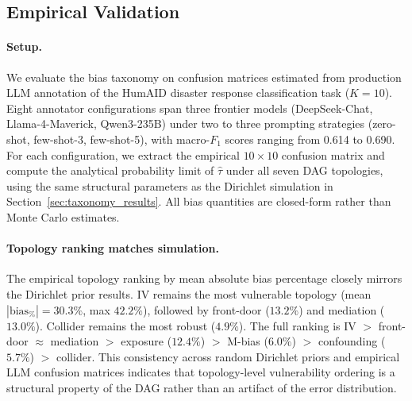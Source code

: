 
\subsection{Empirical Validation}
\label{sec:empirical}

\paragraph{Setup.}
We evaluate the bias taxonomy on confusion matrices estimated from production LLM annotation of the HumAID disaster response classification task ($K{=}10$). Eight annotator configurations span three frontier models (DeepSeek-Chat, Llama-4-Maverick, Qwen3-235B) under two to three prompting strategies (zero-shot, few-shot-3, few-shot-5), with macro-$F_1$ scores ranging from 0.614 to 0.690. For each configuration, we extract the empirical $10{\times}10$ confusion matrix and compute the analytical probability limit of $\hat{\tau}$ under all seven DAG topologies, using the same structural parameters as the Dirichlet simulation in Section~\ref{sec:taxonomy_results}. All bias quantities are closed-form rather than Monte Carlo estimates.

\paragraph{Topology ranking matches simulation.}
The empirical topology ranking by mean absolute bias percentage closely mirrors the Dirichlet prior results. IV remains the most vulnerable topology (mean $|\text{bias}_\%|{=}30.3\%$, max $42.2\%$), followed by front-door ($13.2\%$) and mediation ($13.0\%$). Collider remains the most robust ($4.9\%$). The full ranking is IV $>$ front-door $\approx$ mediation $>$ exposure ($12.4\%$) $>$ M-bias ($6.0\%$) $>$ confounding ($5.7\%$) $>$ collider. This consistency across random Dirichlet priors and empirical LLM confusion matrices indicates that topology-level vulnerability ordering is a structural property of the DAG rather than an artifact of the error distribution.

